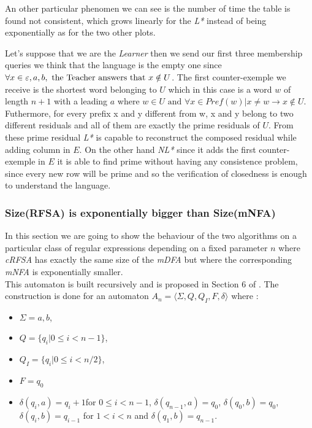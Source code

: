 An other particular phenomen we can see is the number of time the table is found not consistent, which grows linearly for the \textit{L*} instead of being exponentially as for the two other plots.

Let's suppose that we are the \textit{Learner} then we send our first three membership queries we think that the language is the empty one since $\forall x \in{\varepsilon, a, b}, \text{ the Teacher answers that } x \notin U$. The first counter-exemple we receive is the shortest word belonging to $U$ which in this case is a word $w$ of length $n+1$ with a leading $a$ where $w \in U \text{ and } \forall x \in Pref(w) | x \neq w \rightarrow x \notin U$. Futhermore, for every prefix x and y different from w, x and y belong to two different residuals and all of them are exactly the prime residuals of $U$. From these prime residual \textit{L*} is capable to reconstruct the composed residual while adding column in $E$. On the other hand \textit{NL*} since it adds the first counter-exemple in $E$ it is able to find prime without having any consistence problem, since every new row will be prime and so the verification of closedness is enough to understand the language.

\subsubsection{Size(RFSA) is exponentially bigger than Size(mNFA)}
In this section we are going to show the behaviour of the two algorithms on a particular class of regular expressions depending on a fixed parameter $n$ where \textit{cRFSA} has exactly the same size of the \textit{mDFA} but where the corresponding \textit{mNFA} is exponentially smaller.\\
This automaton is built recursively and is proposed in Section 6 of \cite{RFSA}. The construction is done for an automaton $A_n = \langle \Sigma, Q, Q_I, F, \delta \rangle $ where :
\begin{itemize}
  \item $\Sigma = {a, b}$,
  \item $Q = \{q_i | 0 \leq i < n-1 \}$,
  \item $Q_I = \{q_i | 0 \leq i < n/2\}$,
  \item $F = q_0$
  \item $\delta(q_i,a) = q_i+1$for $0 \leq i< n - 1$, $\delta(q_{n-1},a) = q_0$, $\delta(q_0,b)=q_0$, $\delta(q_i,b) = q_{i-1}$ for $1<i<n$ and $\delta(q_1,b)=q_{n-1}$.
\end{itemize}

